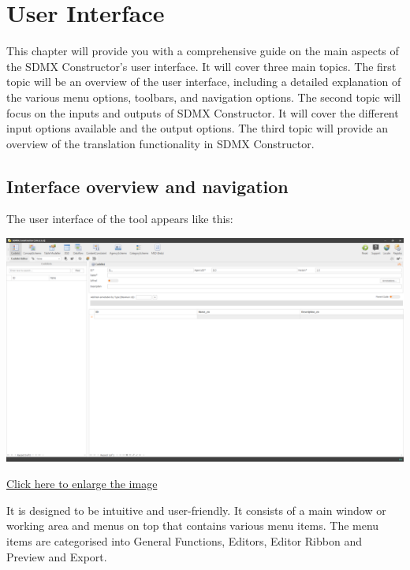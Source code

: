 \documentclass[
]{book}
\begin{document}
\hypertarget{user-interface}{%
\chapter{User Interface}\label{user-interface}}

This chapter will provide you with a comprehensive guide on the main aspects of the SDMX Constructor's user interface. It will cover three main topics. The first topic will be an overview of the user interface, including a detailed explanation of the various menu options, toolbars, and navigation options. The second topic will focus on the inputs and outputs of SDMX Constructor. It will cover the different input options available and the output options. The third topic will provide an overview of the translation functionality in SDMX Constructor.

\hypertarget{interface-overview-and-navigation}{%
\section{Interface overview and navigation}\label{interface-overview-and-navigation}}

The user interface of the tool appears like this:

\begin{center}\includegraphics[width=1\linewidth]{./images/image009} \end{center}

\href{images/image009.png}{Click here to enlarge the image}

It is designed to be intuitive and user-friendly. It consists of a main window or working area and menus on top that contains various menu items. The menu items are categorised into General Functions, Editors, Editor Ribbon and Preview and Export.
\end{document}
